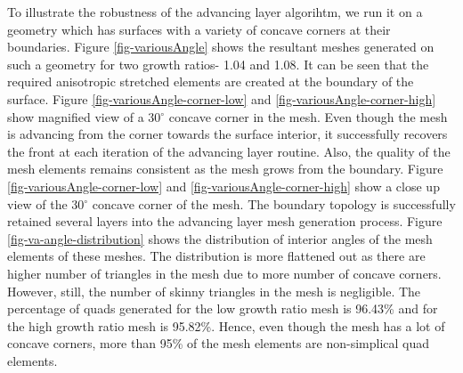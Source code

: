 \documentclass[conf]{new-aiaa}
\begin{document}
To illustrate the robustness of the advancing layer algorihtm, we run it on a geometry which has surfaces with a variety of concave corners at their boundaries. Figure \ref{fig-variousAngle} shows the resultant meshes generated on such a geometry for two growth ratios- 1.04 and 1.08. It can be seen that the required anisotropic stretched elements are created at the boundary of the surface. Figure \ref{fig-variousAngle-corner-low} and \ref{fig-variousAngle-corner-high} show magnified view of a 30$^\circ$ concave corner in the mesh. Even though the mesh is advancing from the corner towards the surface interior, it successfully recovers the front at each iteration of the advancing layer routine. Also, the quality of the mesh elements remains consistent as the mesh grows from the boundary. Figure \ref{fig-variousAngle-corner-low} and \ref{fig-variousAngle-corner-high} show a close up view of the 30$^\circ$ concave corner of the mesh. The boundary topology is successfully retained several layers into the advancing layer mesh generation process. Figure \ref{fig-va-angle-distribution} shows the distribution of interior angles of the mesh elements of these meshes. The distribution is more flattened out as there are higher number of triangles in the mesh due to more number of concave corners. However, still, the number of skinny triangles in the mesh is negligible. The percentage of quads generated for the low growth ratio mesh is 96.43\% and for the high growth ratio mesh is 95.82\%. Hence, even though the mesh has a lot of concave corners, more than 95\% of the mesh elements are non-simplical quad elements.
\end{document}

